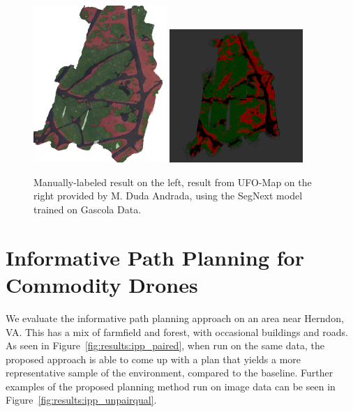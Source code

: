 \begin{figure}
    \centering
    \includegraphics[width=0.45\textwidth]{figs/results/semantic_mapping/labeled_orthomoasaic.png}
    \includegraphics[width=0.45\textwidth]{figs/results/semantic_mapping/segnext_gc5_ufomap.png}
    \caption{Manually-labeled result on the left, result from UFO-Map on the right provided by M. Duda Andrada, using the SegNext model trained on Gascola Data.}
    \label{fig:results:semantic_map_UFO}
\end{figure}


\section{Informative Path Planning for Commodity Drones}
We evaluate the informative path planning approach on an area near Herndon, VA. This has a mix of farmfield and forest, with occasional buildings and roads. As seen in Figure~\ref{fig:results:ipp_paired}, when run on the same data, the proposed approach is able to come up with a plan that yields a more representative sample of the environment, compared to the baseline. Further examples of the proposed planning method run on image data can be seen in Figure~\ref{fig:results:ipp_unpairqual}. 


